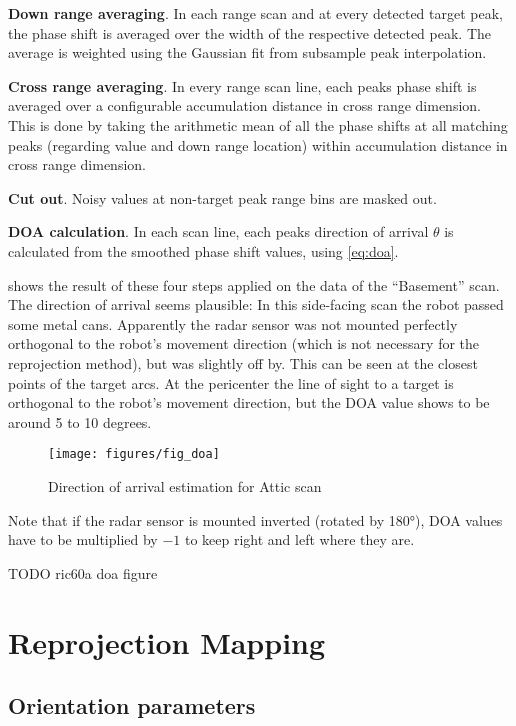 \textbf{Down range averaging}. In each range scan and at every
detected target peak, the phase shift is averaged over the width of the
respective detected peak. The average is weighted using the Gaussian fit
from subsample peak interpolation.

\textbf{Cross range averaging}. In
every range scan line, each peaks phase shift is averaged over a
configurable accumulation distance in cross range dimension. This is
done by taking the arithmetic mean of all the phase shifts at all
matching peaks (regarding value and down range location) within
accumulation distance in cross range dimension.

\textbf{Cut out}. Noisy
values at non-target peak range bins are masked out.

\textbf{DOA calculation}. In each scan line, each peaks direction of arrival
\(\theta\) is calculated from the smoothed phase shift values, using \cref{eq:doa}.

 shows the result of these four steps applied on the data of
the ``Basement'' scan. The direction of arrival seems plausible: In this
side-facing scan the robot passed some metal cans. Apparently the radar
sensor was not mounted perfectly orthogonal to the robot's movement
direction (which is not necessary for the reprojection method), but was
slightly off by. This can be seen at the closest points of the target
arcs. At the pericenter the line of sight to a target is orthogonal to
the robot's movement direction, but the DOA value shows to be around 5
to 10 degrees.

\begin{figure}[htbp]
    \centering
    \texttt{[image: figures/fig\_doa]}
    \caption{Direction of arrival estimation for Attic scan}
    \label{fig:fig_doa}
\end{figure}

Note that if the radar sensor is mounted inverted (rotated by 180°), DOA
values have to be multiplied by \(-1\) to keep right and left where they
are.

TODO ric60a doa figure

\section{Reprojection Mapping}\label{reprojection-mapping}

\subsection{Orientation parameters}\label{orientation-parameters}


